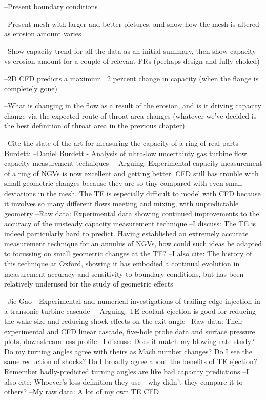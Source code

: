\documentclass[a4paper, 11pt, twoside]{report}
\begin{document}
--Present boundary conditions

--Present mesh with larger and better pictures, and show how the mesh is altered as erosion amount varies

--Show capacity trend for all the data as an initial summary, then show capacity vs erosion amount for a couple of relevant PRs (perhaps design and fully choked)

--2D CFD predicts a maximum ~2 percent change in capacity (when the flange is completely gone)

--What is changing in the flow as a result of the erosion, and is it driving capacity change via the expected route of throat area changes (whatever we've decided is the best definition of throat area in the previous chapter)

--Cite the state of the art for measuring the capacity of a ring of real parts - Burdett:
	--Daniel Burdett - Analysis of ultra-low uncertainty gas turbine flow capacity measurement techniques~\cite{burdett_capacity_measurement}
		--Arguing: Experimental capacity measurement of a ring of NGVs is now excellent and getting better. CFD still has trouble with small geometric changes because they are so tiny compared with even small deviations in the mesh. The TE is especially difficult to model with CFD because it involves so many different flows meeting and mixing, with unpredictable geometry
		--Raw data: Experimental data showing continued improvements to the accuracy of the unsteady capacity measurement technique
		--I discuss: The TE is indeed particularly hard to predict. Having established an extremely accurate measurement technique for an annulus of NGVs, how could such ideas be adapted to focussing on small geometric changes at the TE?
		--I also cite: The history of this technique at Oxford, showing it has embodied a continual evolution in measurement accuracy and sensitivity to boundary conditions, but has been relatively underused for the study of geometric effects
		
--Jie Gao - Experimental and numerical investigations of trailing edge injection in a transonic turbine cascade~\cite{gao_te}
	--Arguing: TE coolant ejection is good for reducing the wake size and reducing shock effects on the exit angle
	--Raw data: Their experimental and CFD linear cascade, five-hole probe data and surface pressure plots, downstream loss profile
	--I discuss: Does it match my blowing rate study? Do my turning angles agree with theirs as Mach number changes? Do I see the same reduction of shocks? Do I broadly agree about the benefits of TE ejection? Remember badly-predicted turning angles are like bad capacity predictions
	--I also cite: Whoever's loss definition they use - why didn't they compare it to others?
	--My raw data: A lot of my own TE CFD
	
\end{document}
